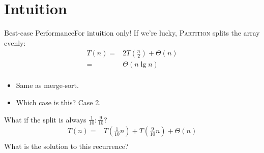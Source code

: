 \documentclass{beamer}
\begin{document}
\section{Intuition}

\begin{frame}{Best-case Performance}{For intuition only!}
    If we're lucky, \textsc{Partition} splits the array evenly: \pause
    \begin{equation*}
        \begin{split}
            T(n) =& 2T\left(\frac{n}{2}\right) + \Theta(n) \\
                 =& \Theta(n \lg n) \\
        \end{split}
    \end{equation*} \pause
    \begin{itemize}
        \item Same as merge-sort. \pause
        \item Which case is this? \pause Case 2.
    \end{itemize} \pause

    What if the split is always $\frac{1}{10}:\frac{9}{10}$? \pause
    \begin{equation*}
        \begin{split}
            T(n) =& T\left(\frac{1}{10} n \right) + T\left(\frac{9}{10} n \right) + \Theta(n) \\
        \end{split}
    \end{equation*}
    What is the solution to this recurrence?
\end{frame}
\end{document}
